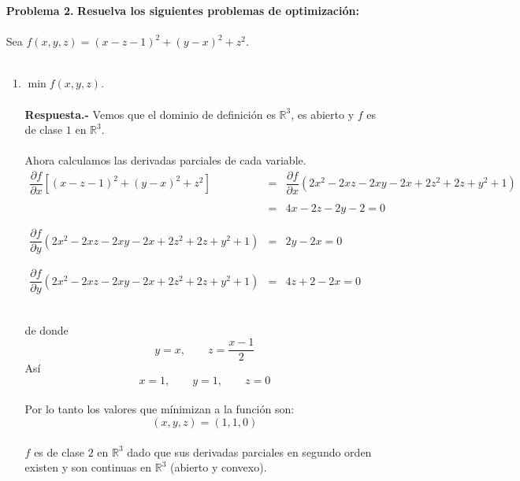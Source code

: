 \begin{enumerate}
    \item [\bfseries Problema 2.] \textbf{Resuelva los siguientes problemas de optimización:}\\\\
	Sea $f(x,y,z)=(x-z-1)^2+(y-x)^2 + z^2.$\\\\

	\begin{enumerate}[\bfseries a)]

	    \item $\min f(x,y,z)$.\\\\
		\textbf{Respuesta.-}\; Vemos que el dominio de definición es $\mathbb{R}^3$, es abierto y $f$ es de clase $1$  en $\mathbb{R}^3$.\\\\

		Ahora calculamos las derivadas parciales de cada variable.\\

		$$\begin{array}{rcl}
		    \dfrac{\partial f}{\partial x} \left[(x-z-1)^2+(y-x)^2 + z^2 \right]&=&\dfrac{\partial f}{\partial x}\left(2x^2-2xz-2xy-2x+2z^2+2z+y^2+1\right)\\\\
											&=&4x-2z-2y-2=0\\\\
											&&\\
		    \dfrac{\partial f}{\partial y}\left(2x^2-2xz-2xy-2x+2z^2+2z+y^2+1\right)&=&2y-2x=0\\\\
											&&\\
		    \dfrac{\partial f}{\partial y}\left(2x^2-2xz-2xy-2x+2z^2+2z+y^2+1\right)&=&4z+2-2x=0\\\\
											    &&\\
		\end{array}$$

		de donde $$y=x,\qquad z=\dfrac{x-1}{2}$$
		Así
		$$x=1,\qquad y=1,\qquad z=0$$\\
		Por lo tanto los valores que mínimizan a la función son:
		$$(x,y,z)=(1,1,0)$$\\

		$f$ es de clase $2$ en $\mathbb{R}^3$ dado que sus derivadas parciales en segundo orden existen y son continuas en $\mathbb{R}^3$ (abierto y convexo).\\


\end{enumerate}
\end{enumerate}
